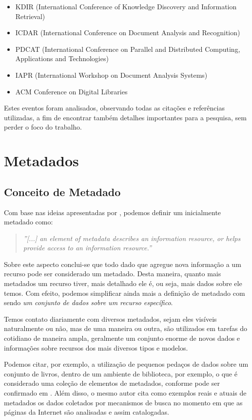 \begin{itemize}
\item KDIR (International Conference of Knowledge Discovery and Information Retrieval)
\item ICDAR (International Conference on Document Analysis and Recognition)
\item PDCAT (International Conference on Parallel and Distributed Computing, Applications and Technologies)
\item IAPR (International Workshop on Document Analysis Systems)
\item ACM Conference on Digital Libraries
\end{itemize}

Estes eventos foram analisados, observando todas as citações e referências utilizadas, a fim de encontrar também detalhes importantes para a pesquisa, sem perder o foco do trabalho.

\section{Metadados}

\subsection{Conceito de Metadado}

Com base nas ideias apresentadas por \cite{meta-dados}, podemos definir um inicialmente metadado como:

\begin{quote}
\textit{''[...] an element of metadata describes an information resource, or helps provide access to an information resource.''}
\end{quote}

Sobre este aspecto conclui-se que todo dado que agregue nova informação a um recurso pode ser considerado um metadado. Desta maneira, quanto mais metadados um recurso tiver, mais detalhado ele é, ou seja, mais dados sobre ele temos. Com efeito, podemos simplificar ainda mais a definição de metadado com sendo \textit{um conjunto de dados sobre um recurso específico}.

Temos contato diariamente com diversos metadados, sejam eles visíveis naturalmente ou não, mas de uma maneira ou outra, são utilizados em tarefas do cotidiano de maneira ampla, geralmente um conjunto enorme de novos dados e informações sobre recursos dos mais diversos tipos e modelos.

Podemos citar, por exemplo, a utilização de pequenos pedaços de dados sobre um conjunto de livros, dentro de um ambiente de biblioteca, por exemplo, o que é considerado uma coleção de elementos de metadados, conforme pode ser confirmado em \cite{meta-dados}. Além disso, o mesmo autor cita como exemplos reais e atuais de metadados os dados coletados por mecanismos de busca no momento em que as páginas da Internet são analisadas e assim catalogadas.

